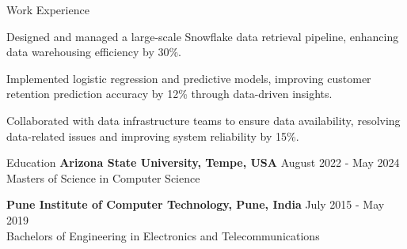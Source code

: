\documentclass{resume} %
\begin{document}
\begin{rSection}{Work Experience}
\begin{rSubsection}
                                    \item Designed and managed a large{-}scale Snowflake data retrieval pipeline, enhancing data warehousing efficiency by 30\%.
                                    \item Implemented logistic regression and predictive models, improving customer retention prediction accuracy by 12\% through data{-}driven insights.
                                    \item Collaborated with data infrastructure teams to ensure data availability, resolving data{-}related issues and improving system reliability by 15\%.
                            \end{rSubsection}
            \end{rSection}

\begin{rSection}{Education}
                        \textbf{Arizona State University, Tempe, USA} \hfill {August 2022 - May 2024} \\
                            {Masters of Science in Computer Science}
                         
             
         
                        \textbf{Pune Institute of Computer Technology, Pune, India} \hfill {July 2015 - May 2019} \\
                            {Bachelors of Engineering in Electronics and Telecommunications}
                         
             
         
    \end{rSection}
\end{document}
